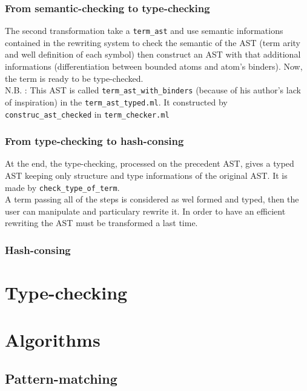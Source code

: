 \documentclass[12pt,a4paper]{article}
\begin{document}
\subsubsection{From semantic-checking to type-checking}
The second transformation take a \verb?term_ast? and use semantic informations
contained in the rewriting system to check the semantic of the AST (term
arity and well definition of each symbol)  then
construct an AST with that additional informations (differentiation between
bounded atoms and atom's binders). Now, the term is ready to be type-checked.
\\
N.B. : This AST is called \verb?term_ast_with_binders? (because of his
author's lack of inspiration) in the \verb?term_ast_typed.ml?.
It constructed by \verb?construc_ast_checked? in \verb?term_checker.ml?

\subsubsection{From type-checking to hash-consing}
At the end, the type-checking, processed on the precedent AST, gives a
typed AST keeping only structure and type informations of the original AST.
It is made by \verb?check_type_of_term?.
\\
A term passing all of the steps is considered as wel formed and typed, then
the user can manipulate and particulary rewrite it. In order to have an
efficient rewriting the AST must be transformed a last time.

\subsubsection{Hash-consing}
\label{data-term-hash-consing}


\section{Type-checking}
\label{typechecking}

\section{Algorithms}
\label{algorithms}

\subsection{Pattern-matching}
\label{pattern-matching}
\end{document}
